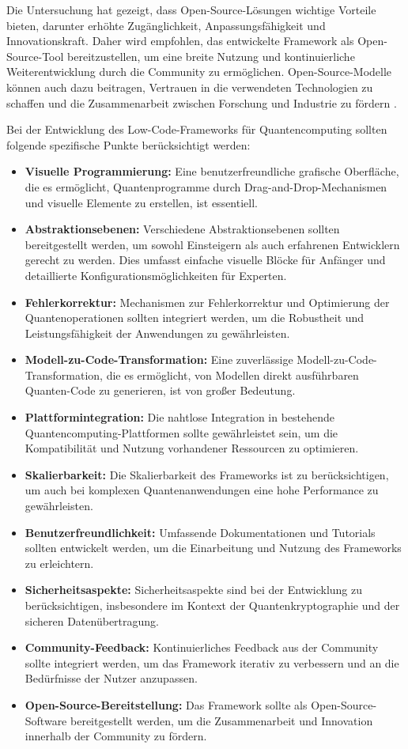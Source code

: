 Die Untersuchung hat gezeigt, dass Open-Source-Lösungen wichtige Vorteile bieten, darunter erhöhte Zugänglichkeit, 
Anpassungsfähigkeit und Innovationskraft. Daher wird empfohlen, das entwickelte Framework als Open-Source-Tool bereitzustellen, 
um eine breite Nutzung und kontinuierliche Weiterentwicklung durch die Community zu ermöglichen. Open-Source-Modelle können 
auch dazu beitragen, Vertrauen in die verwendeten Technologien zu schaffen und die Zusammenarbeit zwischen Forschung und 
Industrie zu fördern \cite{Cabot_2020}.

Bei der Entwicklung des Low-Code-Frameworks für Quantencomputing sollten folgende spezifische Punkte berücksichtigt werden:

\begin{itemize}
    \item \textbf{Visuelle Programmierung:} Eine benutzerfreundliche grafische Oberfläche, die es ermöglicht, Quantenprogramme 
    durch Drag-and-Drop-Mechanismen und visuelle Elemente zu erstellen, ist essentiell.
    \item \textbf{Abstraktionsebenen:} Verschiedene Abstraktionsebenen sollten bereitgestellt werden, um sowohl Einsteigern 
    als auch erfahrenen Entwicklern gerecht zu werden. Dies umfasst einfache visuelle Blöcke für Anfänger und detaillierte Konfigurationsmöglichkeiten für Experten.
    \item \textbf{Fehlerkorrektur:} Mechanismen zur Fehlerkorrektur und Optimierung der Quantenoperationen sollten integriert 
    werden, um die Robustheit und Leistungsfähigkeit der Anwendungen zu gewährleisten.
    \item \textbf{Modell-zu-Code-Transformation:} Eine zuverlässige Modell-zu-Code-Transformation, die es ermöglicht, von Modellen 
    direkt ausführbaren Quanten-Code zu generieren, ist von großer Bedeutung.
    \item \textbf{Plattformintegration:} Die nahtlose Integration in bestehende Quantencomputing-Plattformen sollte gewährleistet 
    sein, um die Kompatibilität und Nutzung vorhandener Ressourcen zu optimieren.
    \item \textbf{Skalierbarkeit:} Die Skalierbarkeit des Frameworks ist zu berücksichtigen, um auch bei komplexen Quantenanwendungen 
    eine hohe Performance zu gewährleisten.
    \item \textbf{Benutzerfreundlichkeit:} Umfassende Dokumentationen und Tutorials sollten entwickelt werden, um die Einarbeitung und 
    Nutzung des Frameworks zu erleichtern.
    \item \textbf{Sicherheitsaspekte:} Sicherheitsaspekte sind bei der Entwicklung zu berücksichtigen, insbesondere im Kontext der 
    Quantenkryptographie und der sicheren Datenübertragung.
    \item \textbf{Community-Feedback:} Kontinuierliches Feedback aus der Community sollte integriert werden, um das Framework iterativ 
    zu verbessern und an die Bedürfnisse der Nutzer anzupassen.
    \item \textbf{Open-Source-Bereitstellung:} Das Framework sollte als Open-Source-Software bereitgestellt werden, um die 
    Zusammenarbeit und Innovation innerhalb der Community zu fördern.
\end{itemize}

